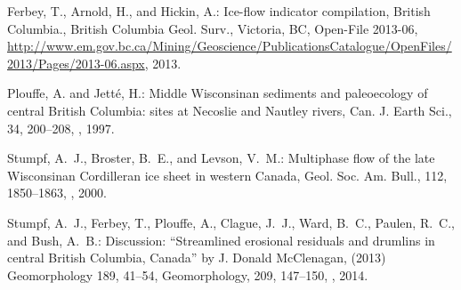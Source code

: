 \begin{thebibliography}{69}

Ferbey, T., Arnold, H., and Hickin, A.: Ice-flow indicator compilation, British
  Columbia., British Columbia Geol. Surv., Victoria, BC, Open-File 2013-06,
  \urlprefix\url{http://www.em.gov.bc.ca/Mining/Geoscience/PublicationsCatalogue/OpenFiles/2013/Pages/2013-06.aspx},
  2013.

Plouffe, A. and Jett{\'{e}}, H.: Middle Wisconsinan sediments and paleoecology
  of central British Columbia: sites at Necoslie and Nautley rivers, Can. J.
  Earth Sci., 34, 200--208, , 1997.

Stumpf, A.~J., Broster, B.~E., and Levson, V.~M.: Multiphase flow of the late
  Wisconsinan Cordilleran ice sheet in western Canada, Geol. Soc. Am. Bull.,
  112, 1850--1863, , 2000.

Stumpf, A.~J., Ferbey, T., Plouffe, A., Clague, J.~J., Ward, B.~C., Paulen,
  R.~C., and Bush, A.~B.: Discussion: ``Streamlined erosional residuals and
  drumlins in central British Columbia, Canada'' by J. Donald {McClenagan},
  (2013) Geomorphology 189, 41--54, Geomorphology, 209, 147--150,
  , 2014.

\end{thebibliography}



